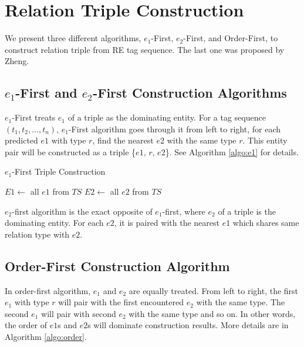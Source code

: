 \section{Relation Triple Construction}
\label{sec:triple}
We present three different algorithms, $e_1$-First, $e_2$-First, and
Order-First, to construct relation triple from RE tag sequence. The last one was
proposed by Zheng.


\subsection*{$e_1$-First and $e_2$-First Construction Algorithms}
$e_1$-First treats $e_1$ of a triple as the dominating entity. For
a tag sequence $(t_1, t_2, \ldots, t_n)$, $e_1$-First algorithm goes through it
from left to right, for each predicted $e1$ with type $r$, find the
nearest $e2$ with the same type $r$. This entity pair will be constructed as a
triple \{$e1$, $r$, $e2$\}. See Algorithm \ref{algo:e1} for details.

\begin{algorithm}%
  \small{
    \caption{$e_1$-First Triple Construction}
    \label{algo:e1}
    
  
    \BlankLine

    $E1 \leftarrow$ all $e1$ from $TS$ \;
    $E2 \leftarrow$ all $e2$ from $TS$ \;
  }
\end{algorithm}

$e_2$-first algorithm is the exact opposite of $e_1$-first, where $e_2$ of a
triple is the dominating entity. For each $e2$, it is paired with the
nearest $e1$ which shares same relation type with $e2$.



\subsection*{Order-First Construction Algorithm}
In order-first algorithm, $e_1$ and $e_2$ are equally treated. 
From left to right, the first $e_1$ with type $r$ will pair 
with the first encountered $e_2$ with the same type. 
The second $e_1$ will pair with second $e_2$ with the same type and so on. In
other words, the order of $e1$s and $e2$s will dominate construction results.
More details are in Algorithm \ref{algo:order}. 

